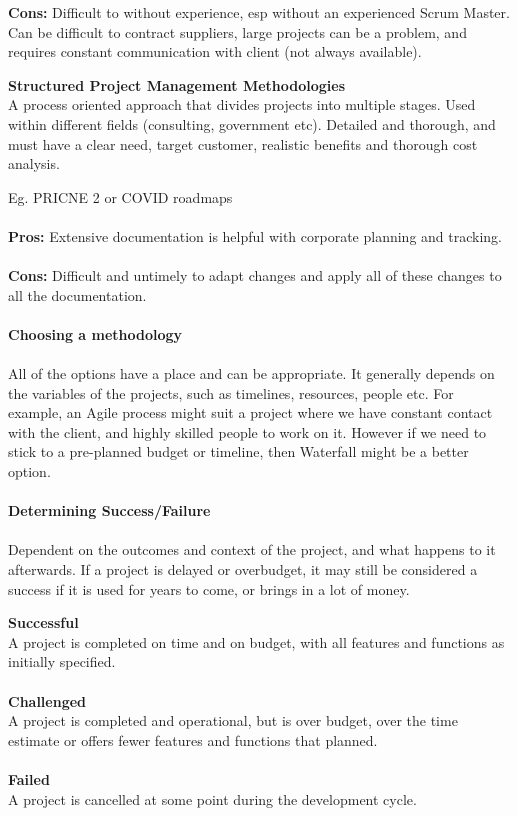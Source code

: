 \documentclass[a4paper,10pt]{article}
\begin{document}
\textbf{Cons:} Difficult to without experience, esp without an experienced Scrum Master. Can be difficult to contract suppliers, large projects can be a problem, and requires constant communication with client (not always available). 
\begin{shaded}
\noindent \textcolor{Emerald}{\textbf{Structured Project Management Methodologies}} \\
A process oriented approach that divides projects into multiple stages. Used within different fields (consulting, government etc). Detailed and thorough, and must have a clear need, target customer, realistic benefits and thorough cost analysis.
\end{shaded}
\noindent Eg. PRICNE 2 or COVID roadmaps \\\\
\textbf{Pros:} Extensive documentation is helpful with corporate planning and tracking. \\\\
\textbf{Cons:} Difficult and untimely to adapt changes and apply all of these changes to all the documentation. \\\\
\textcolor{BlueGreen}{\textbf{Choosing a methodology}} \\\\
All of the options have a place and can be appropriate. It generally depends on the variables of the projects, such as timelines, resources, people etc. For example, an Agile process might suit a project where we have constant contact with the client, and highly skilled people to work on it. However if we need to stick to a pre-planned budget or timeline, then Waterfall might be a better option. \\\\
\textcolor{BlueGreen}{\textbf{Determining Success/Failure}} \\\\
Dependent on the outcomes and context of the project, and what happens to it afterwards. If a project is delayed or overbudget, it may still be considered a success if it is used for years to come, or brings in a lot of money. 
\begin{shaded}
	\noindent \textcolor{Emerald}{\textbf{Successful}} \\
	A project is completed on time and on budget, with all features and functions as initially specified. \\\\
	\noindent \textcolor{Emerald}{\textbf{Challenged}} \\
	A project is completed and operational, but is over budget, over the time estimate or offers fewer features and functions that planned. \\\\
	\noindent \textcolor{Emerald}{\textbf{Failed}} \\
	A project is cancelled at some point during the development cycle. 
\end{shaded}
\end{document}
